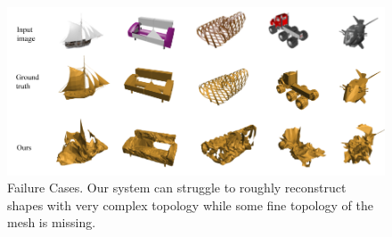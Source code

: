 \begin{figure}[h!]
    \begin{center}
        \includegraphics[width=\linewidth]{imgs/failure_cases.png}
    \end{center}
    \vspace{-4mm}
        \caption{Failure Cases. Our system can struggle to roughly reconstruct shapes with very complex topology while some fine topology of the mesh is missing.}
        \vspace{-4mm}
        \label{fig:failure_cases}
\end{figure}
